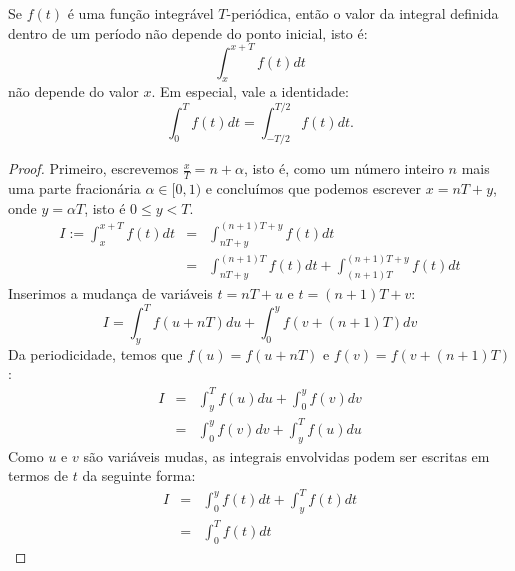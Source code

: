 \begin{teo} Se $f(t)$ é uma função integrável $T$-periódica, então o valor da integral definida dentro de um período não depende do ponto inicial, isto é:
\begin{equation}\int_{x}^{x+T} f(t)dt \end{equation}
não depende do valor $x$. Em especial, vale a identidade:
\begin{equation}\int_{0}^{T} f(t)dt= \int_{-T/2}^{T/2} f(t)dt.\end{equation}
 \end{teo}
\begin{proof}
 Primeiro, escrevemos  $\frac{x}{T}=n+\alpha$, isto é, como um número inteiro $n$ mais uma parte fracionária $\alpha\in [0,1)$ e concluímos que podemos escrever $x=nT+y$, onde $y=\alpha T$, isto é $0\leq y <T$.
 \begin{eqnarray*}
  I:=\int_{x}^{x+T} f(t)dt&=& \int_{nT+y}^{(n+1)T+y} f(t)dt\\
  &=&\int_{nT+y}^{(n+1)T} f(t)dt+\int_{(n+1)T}^{(n+1)T+y} f(t)dt
  \end{eqnarray*}
  Inserimos a mudança de variáveis $t=nT+u$ e $t=(n+1)T+v$:
  \begin{equation}I=\int_{y}^{T} f(u+nT)du+\int_{0}^{y} f(v+(n+1)T)dv\end{equation}
   Da periodicidade, temos que $f(u)=f(u+nT)$ e $f(v)=f(v+(n+1)T)$:
   \begin{eqnarray*}
  I&=&\int_{y}^{T} f(u)du+\int_{0}^{y} f(v)dv\\
  &=&\int_{0}^{y} f(v)dv+\int_{y}^{T} f(u)du
  \end{eqnarray*}
  Como $u$ e $v$ são variáveis mudas, as integrais envolvidas podem ser escritas em termos de $t$ da seguinte forma:
   \begin{eqnarray*}
  I&=&\int_{0}^{y} f(t)dt+\int_{y}^{T} f(t)dt\\
  &=&\int_{0}^{T} f(t)dt
  \end{eqnarray*}
\end{proof}

